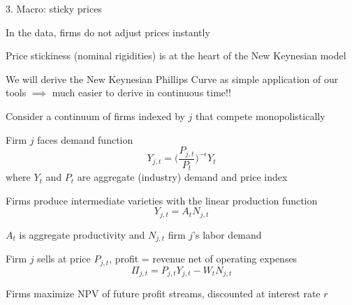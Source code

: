 \documentclass[11pt, aspectratio=169]{beamer}
\newenvironment{witemize}{\itemize\addtolength{\itemsep}{10pt}}{\enditemize}
\begin{document}
\begin{frame}{3. Macro: sticky prices} 
\begin{witemize}
\item In the data, firms do not adjust prices instantly 

\item Price stickiness (nominal rigidities) is at the heart of the New Keynesian model 

\item We will derive the New Keynesian Phillips Curve as simple application of our tools $\implies$ much easier to derive in continuous time!!

\item Consider a continuum of firms indexed by $j$ that compete monopolistically

\item Firm $j$ faces demand function 
\begin{equation*}
	Y_{j, t} = \bigg( \frac{P_{j, t}}{P_t} \bigg)^{- \epsilon} Y_t
\end{equation*}
where $Y_t$ and $P_t$ are aggregate (industry) demand and price index
\end{witemize}
\end{frame}


\begin{frame}{}
\begin{witemize}
\item Firms produce intermediate varieties with the linear production function 
\begin{equation*}
	Y_{j, t} = A_t N_{j, t}
\end{equation*}

\item $A_t$ is aggregate productivity and $N_{j, t}$ firm $j$'s labor demand 

\item Firm $j$ sells at price $P_{j, t}$, profit = revenue net of operating expenses
\begin{equation*}
	\Pi_{j, t} = P_{j, t} Y_{j, t} - W_t N_{j, t}
\end{equation*}

\item Firms maximize NPV of future profit streams, discounted at interest rate $r$
\end{witemize}
\end{frame}
\end{document}
